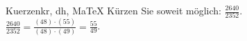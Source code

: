 \begin{MAufgabe}{Kuerzen}{kr, dh, MaTeX}
K\"urzen Sie soweit m\"oglich: $\frac{2640}{2352}$.\\ 
\ifLsg\MLoesung
\quad $\frac{2640}{2352}=\frac{(48)\cdot(55)}{(48)\cdot(49)}=\frac{55}{49}$.\else\relax\fi
 \end{MAufgabe}